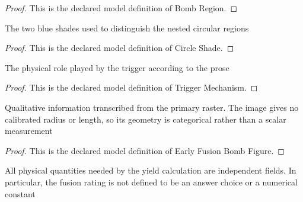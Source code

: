 \begin{proof}
  This is the declared model definition of Bomb Region.
\end{proof}
\begin{definition}
  \label{def:physics:phyx-mini-0573:phyxminiproblems-problemphyxmini0573-circleshade}
  The two blue shades used to distinguish the nested circular regions
\end{definition}
\begin{proof}
  This is the declared model definition of Circle Shade.
\end{proof}
\begin{definition}
  \label{def:physics:phyx-mini-0573:phyxminiproblems-problemphyxmini0573-triggermechanism}
  The physical role played by the trigger according to the prose
\end{definition}
\begin{proof}
  This is the declared model definition of Trigger Mechanism.
\end{proof}
\begin{definition}
  \label{def:physics:phyx-mini-0573:phyxminiproblems-problemphyxmini0573-earlyfusionbombfigure}
  Qualitative information transcribed from the primary raster. The image gives no calibrated radius or length, so its geometry is categorical rather than a scalar measurement
\end{definition}
\begin{proof}
  This is the declared model definition of Early Fusion Bomb Figure.
\end{proof}
\begin{definition}
  \label{def:physics:phyx-mini-0573:phyxminiproblems-problemphyxmini0573-deuteriumfusionbombsetup}
  All physical quantities needed by the yield calculation are independent fields. In particular, the fusion rating is not defined to be an answer choice or a numerical constant
\end{definition}
